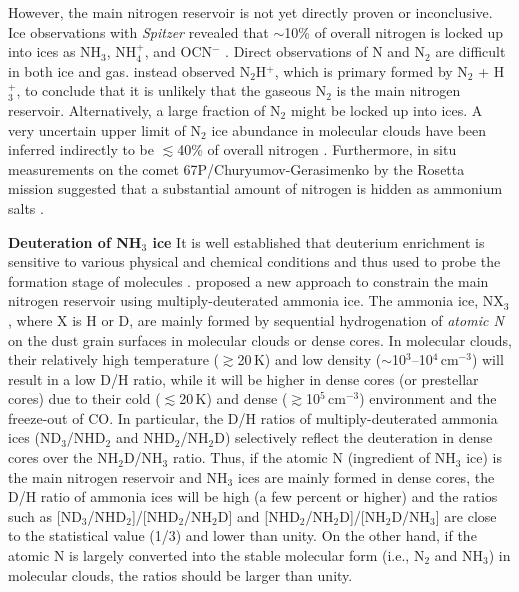 \documentclass[12pt,a4paper]{article}  %
\newcommand{\ammonia}{NH$_3$\xspace}
\begin{document}
\smallskip
\noindent However, the main nitrogen reservoir is not yet directly proven or inconclusive. Ice observations with \textit{Spitzer} revealed that $\sim$10\% of overall nitrogen is locked up into ices as \ammonia, NH$_4^+$, and OCN$^-$ \citep{Oberg11}. Direct observations of N and N$_2$ are difficult in both ice and gas. \citet{Maret06} instead observed N$_2$H$^+$, which is primary formed by N$_2$ + H$_3^+$, to conclude that it is unlikely that the gaseous N$_2$ is the main nitrogen reservoir. Alternatively, a large fraction of N$_2$ might be locked up into ices. A very uncertain upper limit of N$_2$ ice abundance in molecular clouds have been inferred indirectly to be $\lesssim$40\% of overall nitrogen \citep{Boogert15}. Furthermore, in situ measurements on the comet 67P/Churyumov-Gerasimenko by the Rosetta mission suggested that a substantial amount of nitrogen is hidden as ammonium salts \citep{Altwegg20}.

\medskip
\noindent \textbf{Deuteration of \ammonia ice} \quad  It is well established that deuterium enrichment is sensitive to various physical and chemical conditions and thus used to probe the formation stage of molecules \citep[e.g.,][]{Ceccarelli14}. \citet{Furuya18} proposed a new approach to constrain the main nitrogen reservoir using multiply-deuterated ammonia ice. The ammonia ice, NX$_3$, where X is H or D, are mainly formed by sequential hydrogenation of \textit{atomic N} on the dust grain surfaces in molecular clouds or dense cores. In molecular clouds, their relatively high temperature ($\gtrsim$20\,K) and low density ($\sim$10$^3$--10$^4$\,cm$^{-3}$) will result in a low D/H ratio, while it will be higher in dense cores (or prestellar cores) due to their cold ($\lesssim$20\,K) and dense ($\gtrsim$10$^5$\,cm$^{-3}$) environment and the freeze-out of CO. In particular, the D/H ratios of multiply-deuterated ammonia ices (ND$_3$/NHD$_2$ and NHD$_2$/NH$_2$D) selectively reflect the deuteration in dense cores over the NH$_2$D/NH$_3$ ratio. Thus, if the atomic N (ingredient of \ammonia ice) is the main nitrogen reservoir and \ammonia ices are mainly formed in dense cores, the D/H ratio of ammonia ices will be high (a few percent or higher) and the ratios such as [ND$_3$/NHD$_2$]/[NHD$_2$/NH$_2$D] and [NHD$_2$/NH$_2$D]/[NH$_2$D/NH$_3$] are close to the statistical value (1/3) and lower than unity. On the other hand, if the atomic N is largely converted into the stable molecular form (i.e., N$_2$ and NH$_3$) in molecular clouds, the ratios should be larger than unity. 
\end{document}
